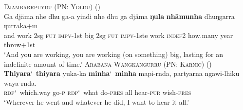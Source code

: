 \documentclass{article}
\begin{document}
\begin{exe}
  \ex\label{ex:idftime} \textsc{Djambarrpuyŋu (PN: Yolŋu)} (\citealt[393]{wilkinson91})\\
  \gll %
  Ga     djäma    nhe    dhu    ga-a        yindi    nhe    dhu    ga     djäma    \textbf{ŋula}        \textbf{nhämunha}    dhuŋgarra    ŋurraka$+$m\\
  and    work    2sg    \textsc{fut}    \textsc{impv}-1st    big    2sg    \textsc{fut}    \textsc{impv}-1ste   work    \textsc{indef2}    how.many    year        throw$+$1st\\
  \glt `And you are working, you are working (on something) big, lasting for an indefinite amount of time.'
  \ex\label{ex:idfrdp} \textsc{Arabana-Wangkangurru (PN: Karnic)} (\citealt[129]{hercus94})\\
  \gll \textbf{Thiyara}\char`~\textbf{thiyara} yuka-ka \textbf{minha}\char`~\textbf{minha} mapi-rnda, partyarna ngawi-lhiku waya-rnda.\\
  \textsc{rdp}\char`~which.way go-\textsc{p} \textsc{rdp}\char`~what do-\textsc{pres} all hear-\textsc{pur} wish-\textsc{pres}\\
  \glt `Wherever he went and whatever he did, I want to hear it all.' %
\end{exe}
\end{document}
